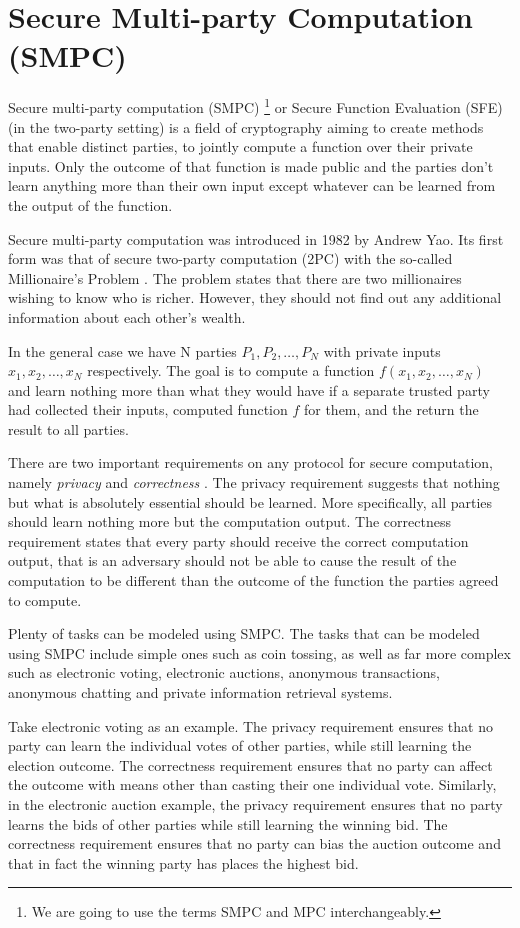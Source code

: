 \section{Secure Multi-party Computation (SMPC)}\label{s:smpc}
Secure multi-party computation (SMPC) \footnote{We are going to use the terms SMPC and MPC interchangeably.} or Secure Function Evaluation (SFE) (in the two-party setting) is a field of cryptography aiming to create methods that enable distinct parties, to jointly compute a function over their private inputs.
Only the outcome of that function is made public and the parties don’t learn anything more than their own input except whatever can be learned from the output of the function.

Secure multi-party computation was introduced in 1982 by Andrew Yao.
Its first form was that of secure two-party computation (2PC) with the so-called Millionaire's Problem \cite{yao1982protocols}.
The problem states that there are two millionaires wishing to know who is richer.
However, they should not find out any additional information about each other’s wealth.

In the general case we have N parties $P_1, P_2, \dots, P_N$ with private inputs $x_1, x_2, \dots, x_N$ respectively.
The goal is to compute a function $f(x_1, x_2, \dots, x_N)$ and learn nothing more than what they would have if a separate trusted party had collected their inputs, computed function $f$ for them, and the return the result to all parties.

There are two important requirements on any protocol for secure computation, namely \textit{privacy} and \textit{correctness} \cite{lindell2009secure}.
The privacy requirement suggests that nothing but what is absolutely essential should be learned.
More specifically, all parties should learn nothing more but the computation output.
The correctness requirement states that every party should receive the correct computation output, that is an adversary should not be able to cause the result of the computation to be different than the outcome of the function the parties agreed to compute.

Plenty of tasks can be modeled using SMPC.
The tasks that can be modeled using SMPC include simple ones such as coin tossing, as well as far more complex such as electronic voting, electronic auctions, anonymous transactions, anonymous chatting and private information retrieval systems.

Take electronic voting as an example.
The privacy requirement ensures that no party can learn the individual votes of other parties, while still learning the election outcome.
The correctness requirement ensures that no party can affect the outcome with means other than casting their one individual vote.
Similarly, in the electronic auction example, the privacy requirement ensures that no party learns the bids of other parties while still learning the winning bid. The correctness requirement ensures that no party can bias the auction outcome and that in fact the winning party has places the highest bid.

